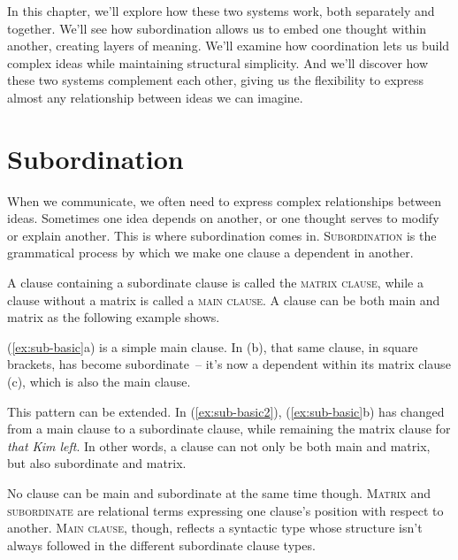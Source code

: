 In this chapter, we'll explore how these two systems work, both separately and together. We'll see how subordination allows us to embed one thought within another, creating layers of meaning. We'll examine how coordination lets us build complex ideas while maintaining structural simplicity. And we'll discover how these two systems complement each other, giving us the flexibility to express almost any relationship between ideas we can imagine.

\section{Subordination}\label{sec:subordination}

When we communicate, we often need to express complex relationships between ideas. Sometimes one idea depends on another, or one thought serves to modify or explain another. This is where subordination comes in. \textsc{Subordination} is the grammatical process by which we make one clause a dependent in another.

A clause containing a subordinate clause is called the \textsc{matrix clause}, while a clause without a matrix is called a \textsc{main clause.} A clause can be both main and matrix as the following example shows.

\ea \label{ex:sub-basic}
    \z
\z

(\ref{ex:sub-basic}a) is a simple main clause. In (b), that same clause, in square brackets, has become subordinate~-- it's now a dependent within its matrix clause (c), which is also the main clause.

This pattern can be extended. In (\ref{ex:sub-basic2}), (\ref{ex:sub-basic}b) has changed from a main clause to a subordinate clause, while remaining the matrix clause for \textit{that Kim left}. In other words, a clause can not only be both main and matrix, but also subordinate and matrix.

\label{ex:sub-basic2}
\z

No clause can be main and subordinate at the same time though. \textsc{Matrix} and \textsc{subordinate} are relational terms expressing one clause's position with respect to another. \textsc{Main clause}, though, reflects a syntactic type whose structure isn't always followed in the different subordinate clause types.

